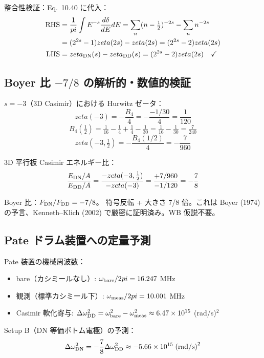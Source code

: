\documentclass[11pt,a4paper]{article}
\def\pi{pi}%
\def\zeta{zeta}%
\def\textbf#1{#1}%
\begin{document}
\textbf{整合性検証}：Eq.\ 10.40 に代入：
\begin{align*}
\text{RHS}
&= \frac{1}{\pi}\int E^{-s}\frac{d\delta}{dE}dE
 = \sum_n (n-\tfrac12)^{-2s} - \sum_n n^{-2s}\\
&= (2^{2s}-1)\zeta(2s) - \zeta(2s) = (2^{2s}-2)\zeta(2s)\\
\text{LHS}
&= \zeta_{\rm DN}(s) - \zeta_{\rm DD}(s) = (2^{2s}-2)\zeta(2s) \quad\checkmark
\end{align*}

\subsection{Boyer 比 $-7/8$ の解析的・数値的検証}

$s = -3$（3D Casimir）における Hurwitz ゼータ：
\[
  \zeta(-3) = -\frac{B_4}{4} = -\frac{-1/30}{4} = \frac{1}{120}
\]
\[
  B_4(\tfrac12) = \tfrac{1}{16} - \tfrac{1}{4} + \tfrac{1}{4} - \tfrac{1}{30}
                = \tfrac{1}{16} - \tfrac{1}{30} = \tfrac{7}{240}
\]
\[
  \zeta(-3, \tfrac12) = -\frac{B_4(1/2)}{4} = -\frac{7}{960}
\]

3D 平行板 Casimir エネルギー比：
\[
  \frac{E_{\rm DN}/A}{E_{\rm DD}/A}
  = \frac{-\zeta(-3,\tfrac12)}{-\zeta(-3)}
  = \frac{+7/960}{-1/120}
  = -\frac{7}{8}
\]

\begin{tcolorbox}[colback=blue!5,colframe=blue!50!black]
\textbf{Boyer 比}：$F_{\rm DN}/F_{\rm DD} = -7/8$。
符号反転 + 大きさ 7/8 倍。これは Boyer (1974) の予言、Kenneth--Klich (2002)
で厳密に証明済み。\textbf{WB 仮説不要}。
\end{tcolorbox}

\subsection{Pate ドラム装置への定量予測}

Pate 装置の機械周波数：
\begin{itemize}
\item bare（カシミールなし）: $\omega_{\rm bare}/2\pi = 16.247$ MHz
\item 観測（標準カシミール下）: $\omega_{\rm meas}/2\pi = 10.001$ MHz
\item Casimir 軟化寄与: $\Delta\omega^2_{\rm DD} = \omega_{\rm bare}^2 - \omega_{\rm meas}^2
  \approx 6.47\times 10^{15}$ (rad/s)$^2$
\end{itemize}

Setup B（DN 等価ボトム電極）の予測：
\[
  \Delta\omega^2_{\rm DN} = -\frac{7}{8}\Delta\omega^2_{\rm DD}
  \approx -5.66\times 10^{15}\;\text{(rad/s)}^2
\]
\end{document}
